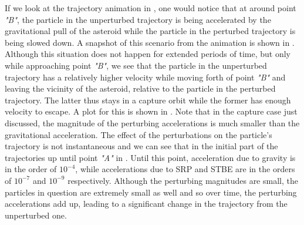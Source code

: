 \FloatBarrier
If we look at the trajectory animation in , one would notice that at around point \textit{"B"}, the particle in the unperturbed trajectory is being accelerated by the gravitational pull of the asteroid while the particle in the perturbed trajectory is being slowed down. A snapshot of this scenario from the animation is shown in . Although this situation does not happen for extended periods of time, but only while approaching point \textit{"B"}, we see that the particle in the unperturbed trajectory has a relatively higher velocity while moving forth of point \textit{"B"} and leaving the vicinity of the asteroid, relative to the particle in the perturbed trajectory. The latter thus stays in a capture orbit while the former has enough velocity to escape. A plot for this is shown in .
%
\newline\newline
%
Note that in the capture case just discussed, the magnitude of the perturbing accelerations is much smaller than the gravitational acceleration. The effect of the perturbations on the particle's trajectory is not instantaneous and we can see that in the initial part of the trajectories up until point \textit{"A"} in . Until this point, acceleration due to gravity is in the order of $10^{-4}$, while accelerations due to \gls{SRP} and \gls{STBE} are in the orders of $10^{-7}$ and $10^{-9}$ respectively. Although the perturbing magnitudes are small, the particles in question are extremely small as well and so over time, the perturbing accelerations add up, leading to a significant change in the trajectory from the unperturbed one.
